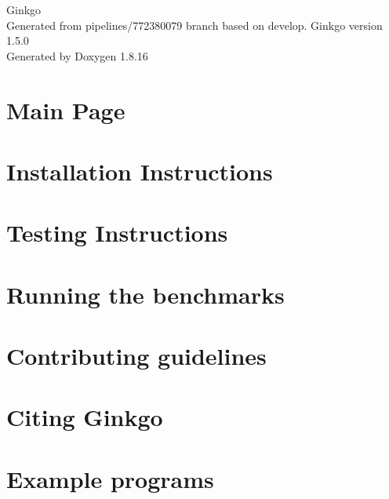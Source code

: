 \let\mypdfximage\pdfximage\def\pdfximage{\immediate\mypdfximage}\documentclass[twoside]{book}
\newcommand{\+}{\discretionary{\mbox{\scriptsize$\hookleftarrow$}}{}{}}
\newcommand{\clearemptydoublepage}{%
  \newpage{\pagestyle{empty}\cleardoublepage}%
}
\begin{document}
\hypersetup{pageanchor=false,
             bookmarksnumbered=true,
             pdfencoding=unicode
            }
\begin{titlepage}
\vspace*{7cm}
\begin{center}%
{\Large Ginkgo \\[1ex]\large Generated from pipelines/772380079 branch based on develop. Ginkgo version 1.\+5.\+0 }\\
\vspace*{1cm}
{\large Generated by Doxygen 1.8.16}\\
\end{center}
\end{titlepage}
\clearemptydoublepage
{}
\tableofcontents
\clearemptydoublepage
{}
\hypersetup{pageanchor=true}

\chapter{Main Page}
\label{index}\hypertarget{index}{}
\chapter{Installation Instructions}
\label{install_ginkgo}

\chapter{Testing Instructions}
\label{testing_ginkgo}

\chapter{Running the benchmarks}
\label{benchmarking_ginkgo}

\chapter{Contributing guidelines}
\label{contributing_guidelines}

\chapter{Citing Ginkgo}
\label{citing_ginkgo}

\chapter{Example programs}
\label{Examples}

\end{document}
